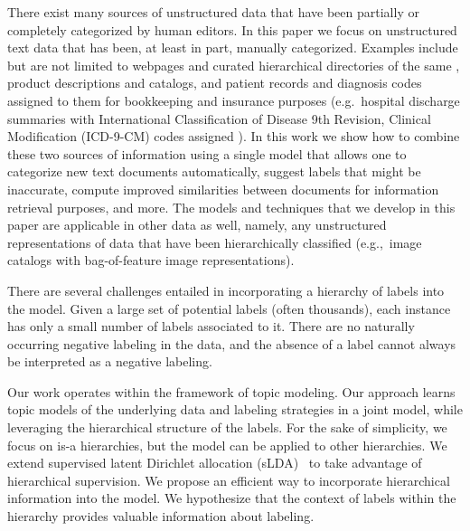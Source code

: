 There exist many sources of unstructured data that have been partially or
completely categorized by human editors.  In this paper we focus on
unstructured text data that has been, at least in part, manually
categorized.  Examples include but are not limited to webpages and curated
hierarchical directories of the same \citep{DMOZ}, product descriptions and
catalogs, %
and patient records %
and diagnosis codes assigned to them for bookkeeping and insurance purposes
(e.g.~hospital discharge summaries with 
International Classification of Disease 9th Revision, Clinical Modification
(ICD-9-CM) codes assigned \cite{ICD9}).  In this work we show how to combine
these two sources of information using a single model that allows one to
categorize new text documents automatically, suggest labels that might be
inaccurate, compute improved similarities between documents for information
retrieval purposes, and more. The models and techniques that we develop in
this paper are applicable in other data as well, namely, any unstructured
representations of data that have been hierarchically classified (e.g.,~image
catalogs with bag-of-feature image representations).

There are several challenges entailed in incorporating a hierarchy of labels
into the model. Given a large set of potential labels (often thousands), each
instance has only a small number of labels associated to it. There are no
naturally occurring negative labeling in the data, and the absence of a label
cannot always be interpreted as a negative labeling. 


Our work operates within the framework of topic modeling. Our approach learns
topic models of the underlying data and labeling strategies in a joint model,
while leveraging the hierarchical structure of the labels. For the sake of
simplicity, we focus on is-a hierarchies, but the model can be
applied to other hierarchies. We extend supervised latent Dirichlet
allocation (sLDA)~\cite{BleiMcAuliffe2008} to take advantage of hierarchical
supervision. We propose an efficient way to incorporate hierarchical
information into the model. We hypothesize that the context of labels within
the hierarchy provides valuable information about labeling. 

